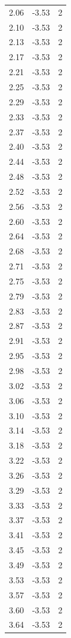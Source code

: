 \begin{longtable}{lrr}
  2.06 & -3.53 & 2 \\
  2.10 & -3.53 & 2 \\
  2.13 & -3.53 & 2 \\
  2.17 & -3.53 & 2 \\
  2.21 & -3.53 & 2 \\
  2.25 & -3.53 & 2 \\
  2.29 & -3.53 & 2 \\
  2.33 & -3.53 & 2 \\
  2.37 & -3.53 & 2 \\
  2.40 & -3.53 & 2 \\
  2.44 & -3.53 & 2 \\
  2.48 & -3.53 & 2 \\
  2.52 & -3.53 & 2 \\
  2.56 & -3.53 & 2 \\
  2.60 & -3.53 & 2 \\
  2.64 & -3.53 & 2 \\
  2.68 & -3.53 & 2 \\
  2.71 & -3.53 & 2 \\
  2.75 & -3.53 & 2 \\
  2.79 & -3.53 & 2 \\
  2.83 & -3.53 & 2 \\
  2.87 & -3.53 & 2 \\
  2.91 & -3.53 & 2 \\
  2.95 & -3.53 & 2 \\
  2.98 & -3.53 & 2 \\
  3.02 & -3.53 & 2 \\
  3.06 & -3.53 & 2 \\
  3.10 & -3.53 & 2 \\
  3.14 & -3.53 & 2 \\
  3.18 & -3.53 & 2 \\
  3.22 & -3.53 & 2 \\
  3.26 & -3.53 & 2 \\
  3.29 & -3.53 & 2 \\
  3.33 & -3.53 & 2 \\
  3.37 & -3.53 & 2 \\
  3.41 & -3.53 & 2 \\
  3.45 & -3.53 & 2 \\
  3.49 & -3.53 & 2 \\
  3.53 & -3.53 & 2 \\
  3.57 & -3.53 & 2 \\
  3.60 & -3.53 & 2 \\
  3.64 & -3.53 & 2 \\

\end{longtable}
